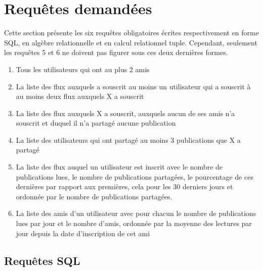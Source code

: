 \documentclass[a4paper,10pt]{article}
\begin{document}
\section{Requêtes demandées}

Cette section présente les six requêtes obligatoires écrites respectivement en forme SQL, en algèbre relationnelle et en calcul relationnel tuple. Cependant, seulement les requêtes 5 et 6 ne doivent pas figurer sous ces deux dernières formes.

	\begin{enumerate}
	    \item Tous les utilisateurs qui ont au plus 2 amis
	    \item La liste des flux auxquels a souscrit au moins un utilisateur qui a souscrit à au moins deux flux auxquels X a souscrit
	    \item La liste des flux auxquels X a souscrit, auxquels aucun de ses amis n’a souscrit et duquel il n’a partagé aucune publication
	    \item La liste des utilisateurs qui ont partagé au moins 3 publications que X a partagé
	    \item La liste des flux auquel un utilisateur est inscrit avec le nombre de publications lues, le nombre de publications partagées, le pourcentage de ces dernières par rapport aux premières, cela pour les 30 derniers jours et ordonnée par le nombre de publications partagées.
	    \item La liste des amis d’un utilisateur avec pour chacun le nombre de publications lues par jour et le nombre d’amis, ordonnée par la moyenne des lectures par jour depuis la date d’inscription de cet ami
	\end{enumerate}
	
\subsection{Requêtes SQL}
\end{document}
